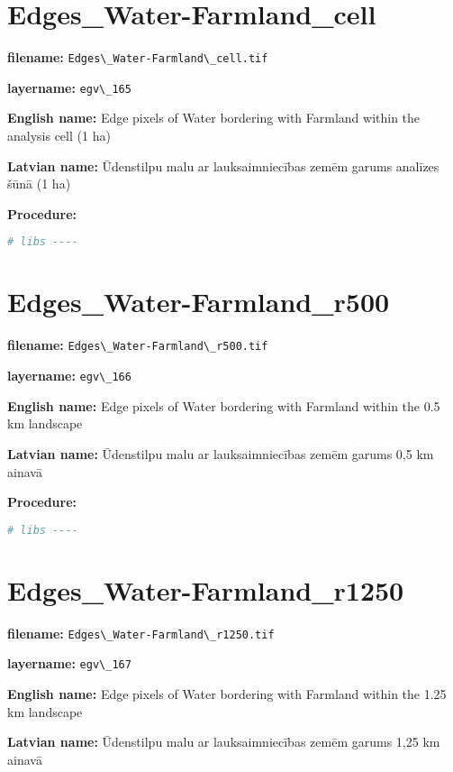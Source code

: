 \documentclass[
]{book}
\newcommand{\passthrough}[1]{#1}
\begin{document}
\section{Edges\_Water-Farmland\_cell}\label{ch06.165}

\textbf{filename:} \passthrough{\lstinline!Edges\_Water-Farmland\_cell.tif!}

\textbf{layername:} \passthrough{\lstinline!egv\_165!}

\textbf{English name:} Edge pixels of Water bordering with Farmland within the analysis cell (1 ha)

\textbf{Latvian name:} Ūdenstilpu malu ar lauksaimniecības zemēm garums analīzes šūnā (1 ha)

\textbf{Procedure:}

\begin{lstlisting}[language=R]
# libs ----
\end{lstlisting}

\section{Edges\_Water-Farmland\_r500}\label{ch06.166}

\textbf{filename:} \passthrough{\lstinline!Edges\_Water-Farmland\_r500.tif!}

\textbf{layername:} \passthrough{\lstinline!egv\_166!}

\textbf{English name:} Edge pixels of Water bordering with Farmland within the 0.5 km landscape

\textbf{Latvian name:} Ūdenstilpu malu ar lauksaimniecības zemēm garums 0,5 km ainavā

\textbf{Procedure:}

\begin{lstlisting}[language=R]
# libs ----
\end{lstlisting}

\section{Edges\_Water-Farmland\_r1250}\label{ch06.167}

\textbf{filename:} \passthrough{\lstinline!Edges\_Water-Farmland\_r1250.tif!}

\textbf{layername:} \passthrough{\lstinline!egv\_167!}

\textbf{English name:} Edge pixels of Water bordering with Farmland within the 1.25 km landscape

\textbf{Latvian name:} Ūdenstilpu malu ar lauksaimniecības zemēm garums 1,25 km ainavā
\end{document}
